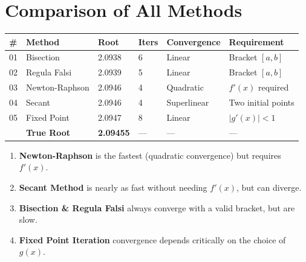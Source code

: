 \documentclass[12pt]{article}
\newcommand{\hcell}[1]{\textbf{\color{white}#1}}
\begin{document}
\newpage

\section*{Comparison of All Methods}

\begin{center}
{\footnotesize\setlength{\tabcolsep}{5pt}
\begin{tabular}{C{0.8cm} p{3cm} C{1.6cm} C{1.3cm} C{2.4cm} p{3.2cm}}
\toprule
{}
\hcell{\#} & \hcell{Method} & \hcell{Root} & \hcell{Iters} & \hcell{Convergence} & \hcell{Requirement} \\
\midrule
{}
01 & Bisection      & 2.0938 & 6 & Linear      & Bracket $[a,b]$ \\
02 & Regula Falsi   & 2.0939 & 5 & Linear      & Bracket $[a,b]$ \\
03 & Newton-Raphson & 2.0946 & 4 & Quadratic   & $f'(x)$ required \\
04 & Secant         & 2.0946 & 4 & Superlinear & Two initial points \\
05 & Fixed Point    & 2.0947 & 8 & Linear      & $|g'(x)|<1$ \\
\midrule
{}
   & \textbf{True Root} & \textbf{2.09455} & — & — & — \\
\bottomrule
\end{tabular}
}
\end{center}

\vspace{10pt}

\begin{observebox}
\begin{enumerate}[noitemsep, topsep=4pt]
  \item \textbf{Newton-Raphson} is the fastest (quadratic convergence) but requires $f'(x)$.
  \item \textbf{Secant Method} is nearly as fast without needing $f'(x)$, but can diverge.
  \item \textbf{Bisection \& Regula Falsi} always converge with a valid bracket, but are slow.
  \item \textbf{Fixed Point Iteration} convergence depends critically on the choice of $g(x)$.
\end{enumerate}
\end{observebox}
\end{document}
